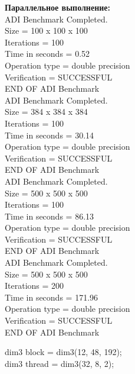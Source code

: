 \documentclass[a4paper,12pt,titlepage,draft]{article}
\begin{document}
\begin{minipage}{.45\textwidth}
\textbf{Параллельное выполнение:}\\

 ADI Benchmark Completed.\\
 Size            =  100 x  100 x  100\\
 Iterations      =                100\\
 Time in seconds =               0.52\\
 Operation type  =   double precision\\
 Verification    =         SUCCESSFUL\\
 END OF ADI Benchmark\\

 ADI Benchmark Completed.\\
 Size            =  384 x  384 x  384\\
 Iterations      =                100\\
 Time in seconds =              30.14\\
 Operation type  =   double precision\\
 Verification    =         SUCCESSFUL\\
 END OF ADI Benchmark\\

 ADI Benchmark Completed.\\
 Size            =  500 x  500 x  500\\
 Iterations      =                100\\
 Time in seconds =              86.13\\
 Operation type  =   double precision\\
 Verification    =         SUCCESSFUL\\
 END OF ADI Benchmark\\

 ADI Benchmark Completed.\\
 Size            =  500 x  500 x  500\\
 Iterations      =                200\\
 Time in seconds =             171.96\\
 Operation type  =   double precision\\
 Verification    =         SUCCESSFUL\\
 END OF ADI Benchmark\\

\end{minipage}
\newpage
\begin{center}
    dim3 block = dim3(12, 48, 192);\\
    dim3 thread = dim3(32, 8, 2);\\
\end{center}
\end{document}

